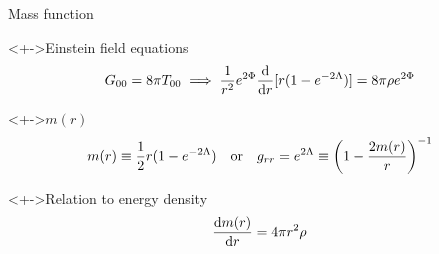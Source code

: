 \documentclass{beamer}
\let\svthefootnote\thefootnote
\newcommand\blankfootnote[1]{%
  \let\thefootnote\relax\footnotetext{#1}%
  \let\thefootnote\svthefootnote%
}
\begin{document}
\begin{frame}{Mass function}

\begin{block}<+->{Einstein field equations}
\begin{displaymath}
  G_{00} = 8 \pi T_{00}
  \implies
  \frac{1}{r^2} e^{2\Phi} \dv{r} [r (1 - e^{-2\Lambda})] =
  8 \pi \rho e^{2\Phi}
\end{displaymath}
\end{block}

\begin{block}<+->{$m(r)$}
\begin{displaymath}
  m(r) \equiv \frac{1}{2} r (1 - e^{-2\Lambda})
  \quad \textrm{or} \quad
  g_{rr} = e^{2\Lambda} \equiv \qty(1 - \frac{2 m(r)}{r})^{-1}
\end{displaymath}
\end{block}

\begin{block}<+->{Relation to energy density}
\begin{displaymath}
  \dv{m(r)}{r} = 4 \pi r^2 \rho
\end{displaymath}
\end{block}

\blankfootnote{\textcite[pp. 260--262]{Schutz}}



\end{frame}

\end{document}
